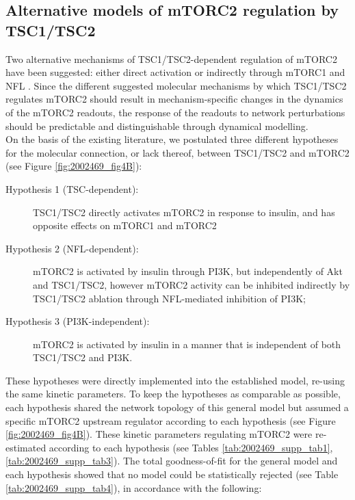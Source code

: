 \subsection{Alternative models of mTORC2 regulation by TSC1\fshyp{}TSC2}
\label{paper1-subsec:Alternative models of mTORC2 regulation by TSC1/TSC2}
Two alternative mechanisms of TSC1/TSC2-dependent regulation of mTORC2 have been suggested: either direct activation or indirectly through mTORC1 and NFL \citep{Huang2008, Huang2009signaling, Yang2006tsc1}. Since the different suggested molecular mechanisms by which TSC1/TSC2 regulates mTORC2 should result in mechanism-specific changes in the dynamics of the mTORC2 readouts, the response of the readouts to network perturbations should be predictable and distinguishable through dynamical modelling. \\
On the basis of the existing literature, we postulated three different hypotheses for the molecular connection, or lack thereof, between TSC1/TSC2 and mTORC2 (see Figure \ref{fig:2002469_fig4B}): 
\begin{description}
 \item[Hypothesis 1 (TSC-dependent):] TSC1/TSC2 directly activates mTORC2 in response to insulin, and has opposite effects on mTORC1 and mTORC2
 \item[Hypothesis 2 (NFL-dependent):] mTORC2 is activated by insulin through PI3K, but independently of Akt and TSC1/TSC2, however mTORC2 activity can be inhibited indirectly by TSC1/TSC2 ablation through NFL-mediated inhibition of PI3K;
 \item[Hypothesis 3 (PI3K-independent):] mTORC2 is activated by insulin in a manner that is independent of both TSC1/TSC2 and PI3K.
\end{description}
These hypotheses were directly implemented into the established model, re-using the same kinetic parameters. To keep the hypotheses as comparable as possible, each hypothesis shared the network topology of this general model but assumed a specific mTORC2 upstream regulator according to each hypothesis (see Figure \ref{fig:2002469_fig4B}). These kinetic parameters regulating mTORC2 were re-estimated according to each hypothesis (see Tables \ref{tab:2002469_supp_tab1}, \ref{tab:2002469_supp_tab3}). The total goodness-of-fit for the general model and each hypothesis showed that no model could be statistically rejected (see Table \ref{tab:2002469_supp_tab4}), in accordance with the following: 


